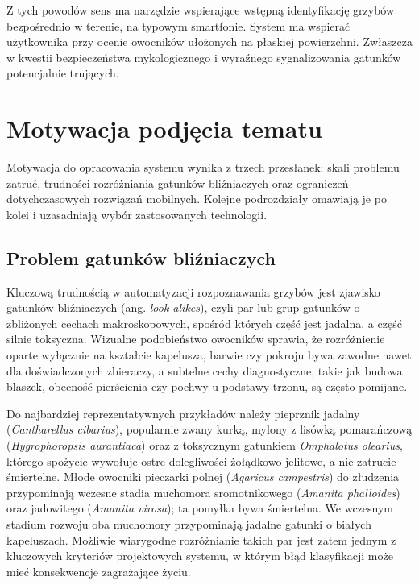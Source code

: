 Z tych powodów sens ma narzędzie wspierające wstępną identyfikację grzybów bezpośrednio w terenie, na typowym smartfonie. System ma wspierać użytkownika przy ocenie owocników ułożonych na płaskiej powierzchni. Zwłaszcza w kwestii bezpieczeństwa mykologicznego i wyraźnego sygnalizowania gatunków potencjalnie trujących.

\section{Motywacja podjęcia tematu}
Motywacja do opracowania systemu wynika z trzech przesłanek: skali problemu zatruć, trudności rozróżniania gatunków bliźniaczych oraz ograniczeń dotychczasowych rozwiązań mobilnych. Kolejne podrozdziały omawiają je po kolei i uzasadniają wybór zastosowanych technologii.

\subsection{Problem gatunków bliźniaczych}
Kluczową trudnością w automatyzacji rozpoznawania grzybów jest zjawisko gatunków bliźniaczych (ang. \textit{look-alikes}), czyli par lub grup gatunków o zbliżonych cechach makroskopowych, spośród których część jest jadalna, a część silnie toksyczna. Wizualne podobieństwo owocników sprawia, że rozróżnienie oparte wyłącznie na kształcie kapelusza, barwie czy pokroju bywa zawodne nawet dla doświadczonych zbieraczy, a subtelne cechy diagnostyczne, takie jak budowa blaszek, obecność pierścienia czy pochwy u podstawy trzonu, są często pomijane.

Do najbardziej reprezentatywnych przykładów należy pieprznik jadalny (\textit{Cantharellus cibarius}), popularnie zwany kurką, mylony z lisówką pomarańczową (\textit{Hygrophoropsis aurantiaca}) oraz z toksycznym gatunkiem \textit{Omphalotus olearius}, którego spożycie wywołuje ostre dolegliwości żołądkowo-jelitowe, a nie zatrucie śmiertelne. Młode owocniki pieczarki polnej (\textit{Agaricus campestris}) do złudzenia przypominają wczesne stadia muchomora sromotnikowego (\textit{Amanita phalloides}) oraz jadowitego (\textit{Amanita virosa}); ta pomyłka bywa śmiertelna. We wczesnym stadium rozwoju oba muchomory przypominają jadalne gatunki o białych kapeluszach. Możliwie wiarygodne rozróżnianie takich par jest zatem jednym z kluczowych kryteriów projektowych systemu, w którym błąd klasyfikacji może mieć konsekwencje zagrażające życiu.

